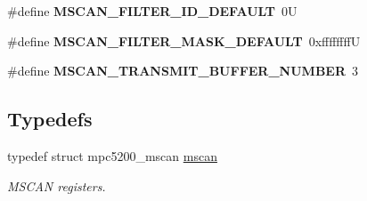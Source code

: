 \begin{DoxyCompactItemize}
\#define {\bfseries M\+S\+C\+A\+N\+\_\+\+F\+I\+L\+T\+E\+R\+\_\+\+I\+D\+\_\+\+D\+E\+F\+A\+U\+LT}~0U
\item 
\mbox{\label{group__RTEMSBSPsPowerPCGen5200MSCAN_ga0baf4f3371b3708100e2a4f8bbb2e5ff}} 
\#define {\bfseries M\+S\+C\+A\+N\+\_\+\+F\+I\+L\+T\+E\+R\+\_\+\+M\+A\+S\+K\+\_\+\+D\+E\+F\+A\+U\+LT}~0xffffffffU
\item 
\mbox{\label{group__RTEMSBSPsPowerPCGen5200MSCAN_gaf3d33a4f9e6a64d7a0bbe7c461687bd6}} 
\#define {\bfseries M\+S\+C\+A\+N\+\_\+\+T\+R\+A\+N\+S\+M\+I\+T\+\_\+\+B\+U\+F\+F\+E\+R\+\_\+\+N\+U\+M\+B\+ER}~3
\end{DoxyCompactItemize}
\subsection*{Typedefs}
\begin{DoxyCompactItemize}
\item 
\mbox{\label{group__RTEMSBSPsPowerPCGen5200MSCAN_gacfd56a4a482c5e7da2cff003284b2d51}} 
typedef struct mpc5200\+\_\+mscan \mbox{\hyperlink{group__RTEMSBSPsPowerPCGen5200MSCAN_gacfd56a4a482c5e7da2cff003284b2d51}{mscan}}
\begin{DoxyCompactList}\small\item\em M\+S\+C\+AN registers. \end{DoxyCompactList}\end{DoxyCompactItemize}
